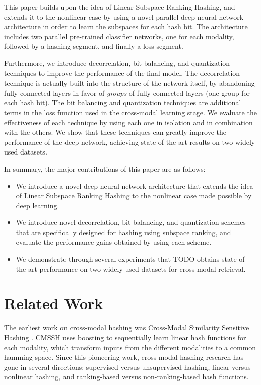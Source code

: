 \documentclass[letterpaper]{article}
\begin{document}
This paper builds upon the idea of Linear Subspace Ranking Hashing, and extends it to the nonlinear case by using a novel parallel deep neural network architecture in order to learn the subspaces for each hash bit. The architecture includes two parallel pre-trained classifier networks, one for each modality, followed by a hashing segment, and finally a loss segment.

Furthermore, we introduce decorrelation, bit balancing, and quantization techniques to improve the performance of the final model. The decorrelation technique is actually built into the structure of the network itself, by abandoning fully-connected layers in favor of \emph{groups} of fully-connected layers (one group for each hash bit). The bit balancing and quantization techniques are additional terms in the loss function used in the cross-modal learning stage. We evaluate the effectiveness of each technique by using each one in isolation and in combination with the others. We show that these techniques can greatly improve the performance of the deep network, achieving state-of-the-art results on two widely used datasets.

In summary, the major contributions of this paper are as follows:
\begin{itemize}
	\item We introduce a novel deep neural network architecture that extends the idea of Linear Subspace Ranking Hashing \cite{kai} to the nonlinear case made possible by deep learning. 
	\item We introduce novel decorrelation, bit balancing, and quantization schemes that are specifically designed for hashing using subspace ranking, and evaluate the performance gains obtained by using each scheme.
	\item We demonstrate through several experiments that TODO obtains state-of-the-art performance on two widely used datasets for cross-modal retrieval.
\end{itemize}


\section{Related Work}

The earliest work on cross-modal hashing was Cross-Modal Similarity Sensitive Hashing \cite{cmssh}. CMSSH uses boosting to sequentially learn linear hash functions for each modality, which transform inputs from the different modalities to a common hamming space. Since this pioneering work, cross-modal hashing research has gone in several directions: supervised versus unsupervised hashing, linear versus nonlinear hashing, and ranking-based versus non-ranking-based hash functions.
\end{document}
